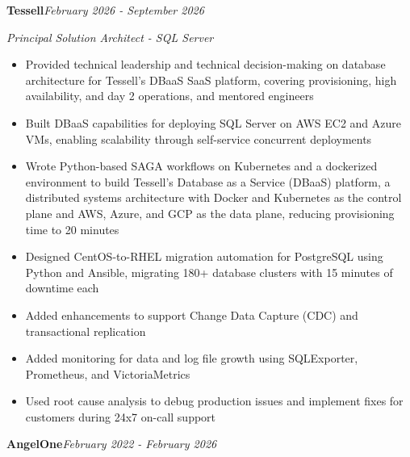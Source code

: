 \documentclass[10pt,a4paper]{article}
\begin{document}
\noindent\textbf{Tessell}\hfill \textit{February 2026 - September 2026}

\textit{Principal Solution Architect - SQL Server}\\[-5pt]
\begin{itemize}
  \item Provided technical leadership and technical decision-making on database architecture for Tessell's DBaaS SaaS platform, covering provisioning, high availability, and day 2 operations, and mentored engineers
  \item Built DBaaS capabilities for deploying SQL Server on AWS EC2 and Azure VMs, enabling scalability through self-service concurrent deployments
  \item Wrote Python-based SAGA workflows on Kubernetes and a dockerized environment to build Tessell's Database as a Service (DBaaS) platform, a distributed systems architecture with Docker and Kubernetes as the control plane and AWS, Azure, and GCP as the data plane, reducing provisioning time to 20 minutes
  \item Designed CentOS-to-RHEL migration automation for PostgreSQL using Python and Ansible, migrating 180+ database clusters with 15 minutes of downtime each
  \item Added enhancements to support Change Data Capture (CDC) and transactional replication
  \item Added monitoring for data and log file growth using SQLExporter, Prometheus, and VictoriaMetrics
  \item Used root cause analysis to debug production issues and implement fixes for customers during 24x7 on-call support
\end{itemize}
\vspace{14.7pt}
\noindent\textbf{AngelOne}\hfill \textit{February 2022 - February 2026}
\end{document}
